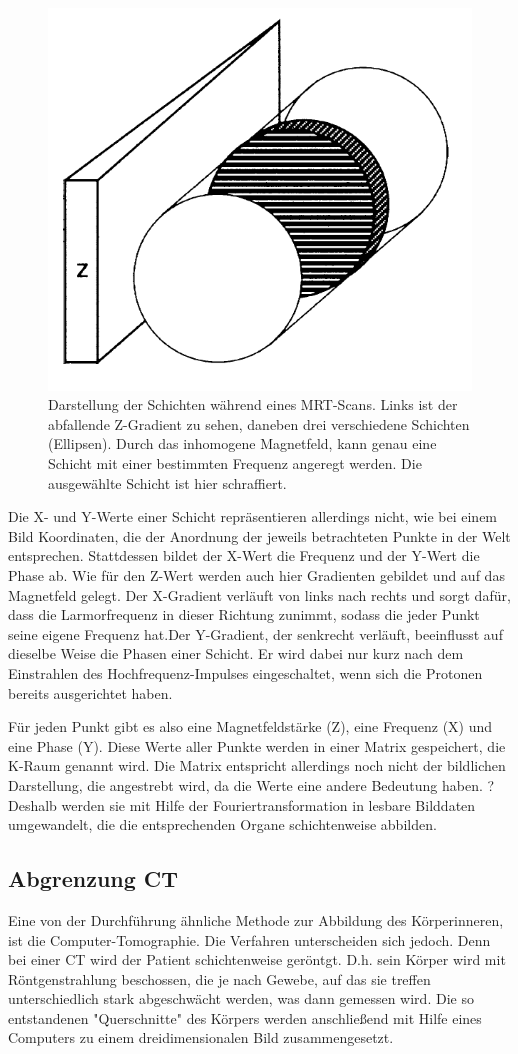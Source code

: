 \begin{figure}
	\centering
	\includegraphics[width=0.3\linewidth]{images/zGradientMrt.png}
	\caption{Darstellung der Schichten während eines MRT-Scans. Links ist der abfallende Z-Gradient zu sehen, daneben drei verschiedene Schichten (Ellipsen). Durch das inhomogene Magnetfeld, kann genau eine Schicht mit einer bestimmten Frequenz angeregt werden. Die ausgewählte Schicht ist hier schraffiert. \citet{weishaupt09}}
	\label{img:zGradient}
\end{figure}


Die X- und Y-Werte einer Schicht repräsentieren allerdings nicht, wie bei einem Bild Koordinaten, die der Anordnung der jeweils betrachteten Punkte in der Welt entsprechen. Stattdessen bildet der X-Wert die Frequenz und der Y-Wert die Phase ab. Wie für den Z-Wert werden auch hier Gradienten gebildet und auf das Magnetfeld gelegt. Der X-Gradient verläuft von links nach rechts und sorgt dafür, dass die Larmorfrequenz in dieser Richtung zunimmt, sodass die jeder Punkt seine eigene Frequenz hat.Der Y-Gradient, der senkrecht verläuft, beeinflusst auf dieselbe Weise die Phasen einer Schicht. Er wird dabei nur kurz nach dem Einstrahlen des Hochfrequenz-Impulses eingeschaltet, wenn sich die Protonen bereits ausgerichtet haben.

Für jeden Punkt gibt es also eine Magnetfeldstärke (Z), eine Frequenz (X) und eine Phase (Y). Diese Werte aller Punkte werden in einer Matrix gespeichert, die K-Raum genannt wird. Die Matrix entspricht allerdings noch nicht der bildlichen Darstellung, die angestrebt wird, da die Werte eine andere Bedeutung haben. ? Deshalb werden sie mit Hilfe der Fouriertransformation in lesbare Bilddaten umgewandelt, die die entsprechenden Organe schichtenweise abbilden. 
\citet{weishaupt09}

\subsection{Abgrenzung CT}
Eine von der Durchführung ähnliche Methode zur Abbildung des Körperinneren, ist die Computer-Tomographie. Die Verfahren unterscheiden sich jedoch. Denn bei einer CT wird der Patient schichtenweise geröntgt. D.h. sein Körper wird mit Röntgenstrahlung beschossen, die je nach Gewebe, auf das sie treffen unterschiedlich stark abgeschwächt werden, was dann gemessen wird. Die so entstandenen "Querschnitte" des Körpers werden anschließend mit Hilfe eines Computers zu einem dreidimensionalen Bild zusammengesetzt. 

